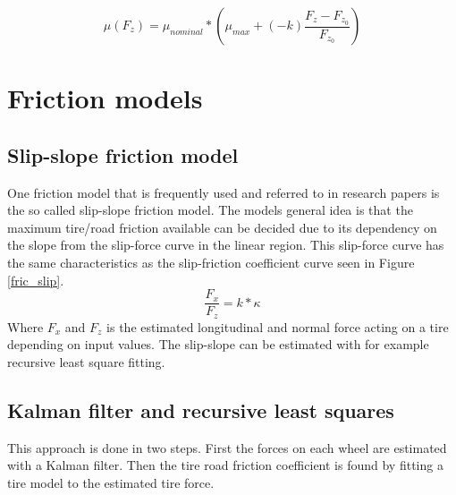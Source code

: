 \begin{equation}
\mu(F_{z})=\mu_{nominal}*(\mu_{max} + (-k)\frac{F_{z} - F_{z_{0}}}{F_{z_{0}}})
\end{equation}

\section{Friction models}

\subsection{Slip-slope friction model}

One friction model that is frequently used and referred to in research papers is the so called slip-slope friction model. The models general idea is that the maximum tire/road friction available can be decided due to its dependency on the slope from the slip-force curve in the linear region. This slip-force curve has the same characteristics as the slip-friction coefficient curve seen in Figure \ref{fric_slip}. 
\begin{equation}
	\dfrac{F_{x}}{F_{z}} = k*\kappa
\end{equation}
Where $ F_{x} $ and $ F_{z} $ is the estimated longitudinal and normal force acting on a tire depending on input values. The slip-slope can be estimated with for example recursive least square fitting.


\subsection{Kalman filter and recursive least squares}
This approach is done in two steps. First the forces on each wheel are estimated with a Kalman filter. Then the tire road friction coefficient is found by fitting a tire model to the estimated tire force.